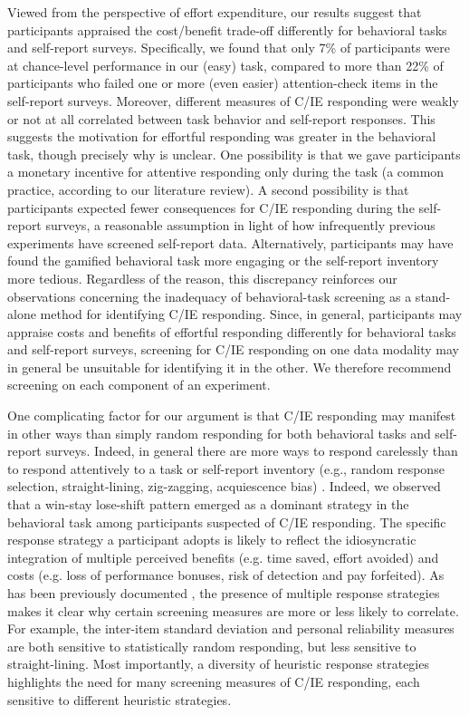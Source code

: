 \documentclass[a4paper,notitlepage,12pt]{article}
\begin{document}
Viewed from the perspective of effort expenditure, our results suggest that participants appraised the cost/benefit trade-off differently for behavioral tasks and self-report surveys. Specifically, we found that only 7\% of participants were at chance-level performance in our (easy) task, compared to more than 22\% of participants who failed one or more (even easier) attention-check items in the self-report surveys. Moreover, different measures of C/IE responding were weakly or not at all correlated between task behavior and self-report responses. This suggests the motivation for effortful responding was greater in the behavioral task, though precisely why is unclear. One possibility is that we gave participants a monetary incentive for attentive responding only during the task (a common practice, according to our literature review). A second possibility is that participants expected fewer consequences for C/IE responding during the self-report surveys, a reasonable assumption in light of how infrequently previous experiments have screened self-report data. Alternatively, participants may have found the gamified behavioral task more engaging or the self-report inventory more tedious. Regardless of the reason, this discrepancy reinforces our observations concerning the inadequacy of behavioral-task screening as a stand-alone method for identifying C/IE responding. Since, in general, participants may appraise costs and benefits of effortful responding differently for behavioral tasks and self-report surveys, screening for C/IE responding on one data modality may in general be unsuitable for identifying it in the other. We therefore recommend screening on each component of an experiment.

One complicating factor for our argument is that C/IE responding may manifest in other ways than simply random responding for both behavioral tasks and self-report surveys. Indeed, in general there are more ways to respond carelessly than to respond attentively to a task or self-report inventory (e.g., random response selection, straight-lining, zig-zagging, acquiescence bias) \cite{curran2016methods}. Indeed, we observed that a win-stay lose-shift pattern emerged as a dominant strategy in the behavioral task among participants suspected of C/IE responding. The specific response strategy a participant adopts is likely to reflect the idiosyncratic integration of multiple perceived benefits (e.g. time saved, effort avoided) and costs (e.g. loss of performance bonuses, risk of detection and pay forfeited). As has been previously documented \cite{desimone2018dirty}, the presence of multiple response strategies makes it clear why certain screening measures are more or less likely to correlate. For example, the inter-item standard deviation and personal reliability measures are both sensitive to statistically random responding, but less sensitive to straight-lining. Most importantly, a diversity of heuristic response strategies highlights the need for many screening measures of C/IE responding, each sensitive to different heuristic strategies. 
\end{document}
